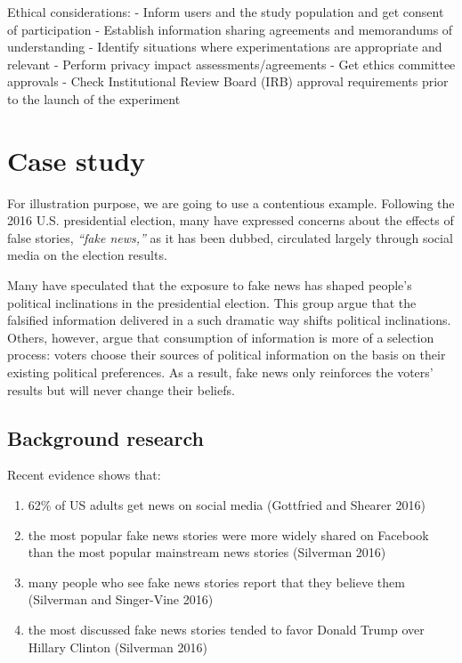 \documentclass[]{book}
\providecommand{\tightlist}{%
  \setlength{\itemsep}{0pt}\setlength{\parskip}{0pt}}
\begin{document}
Ethical considerations:
- Inform users and the study population and get consent of participation
- Establish information sharing agreements and memorandums of understanding
- Identify situations where experimentations are appropriate and relevant
- Perform privacy impact assessments/agreements
- Get ethics committee approvals
- Check Institutional Review Board (IRB) approval requirements prior to the launch of the experiment

\hypertarget{case-study}{%
\chapter{Case study}\label{case-study}}

For illustration purpose, we are going to use a contentious example. Following the 2016 U.S. presidential election, many have expressed concerns about the effects of false stories, \emph{``fake news,''} as it has been dubbed, circulated largely through social media on the election results.

Many have speculated that the exposure to fake news has shaped people's political inclinations in the presidential election. This group argue that the falsified information delivered in a such dramatic way shifts political inclinations. Others, however, argue that consumption of information is more of a selection process: voters choose their sources of political information on the basis on their existing political preferences. As a result, fake news only reinforces the voters' results but will never change their beliefs.

\hypertarget{background-research}{%
\section{Background research}\label{background-research}}

Recent evidence shows that:

\begin{enumerate}
\def\labelenumi{(\arabic{enumi})}
\tightlist
\item
  62\% of US adults get news on social media (Gottfried and Shearer 2016)
\item
  the most popular fake news stories were more widely shared on Facebook than the most popular mainstream news stories (Silverman 2016)
\item
  many people who see fake news stories report that they believe them (Silverman and Singer-Vine 2016)
\item
  the most discussed fake news stories tended to favor Donald Trump over Hillary Clinton (Silverman 2016)
\end{enumerate}
\end{document}
